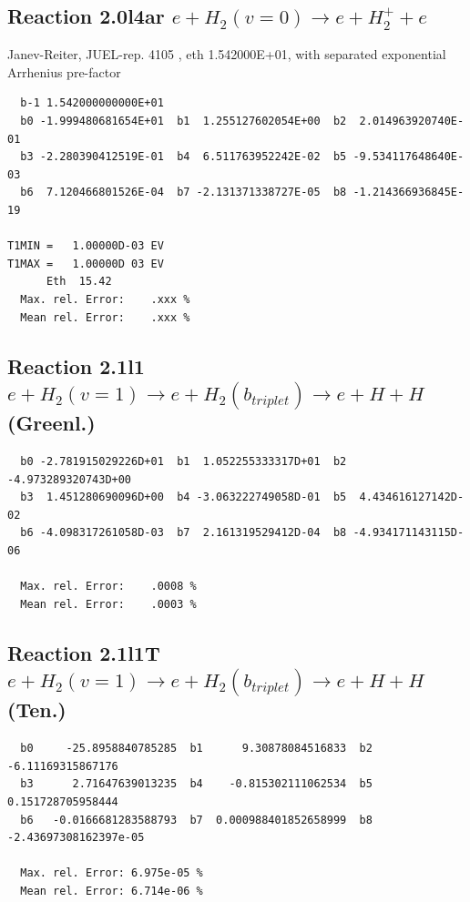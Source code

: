 \documentclass[12pt,dvipdfmx]{article}
\begin{document}
\subsection{
Reaction 2.0l4ar
 $ e + H_2(v=0) \rightarrow e + H_2^+ + e$
}
Janev-Reiter, JUEL-rep. 4105 \cite{kn:JRS}, eth 1.542000E+01,
with separated exponential Arrhenius pre-factor

\begin{small}\begin{verbatim}
  b-1 1.542000000000E+01
  b0 -1.999480681654E+01  b1  1.255127602054E+00  b2  2.014963920740E-01
  b3 -2.280390412519E-01  b4  6.511763952242E-02  b5 -9.534117648640E-03
  b6  7.120466801526E-04  b7 -2.131371338727E-05  b8 -1.214366936845E-19

T1MIN =   1.00000D-03 EV
T1MAX =   1.00000D 03 EV
      Eth  15.42
  Max. rel. Error:    .xxx %
  Mean rel. Error:    .xxx %
\end{verbatim}\end{small}

\newpage
\subsection{
Reaction 2.1l1
$ e + H_2(v=1) \rightarrow e + H_2(b_{triplet})\rightarrow e + H + H $ (Greenl.)
}


\begin{small}\begin{verbatim}
  b0 -2.781915029226D+01  b1  1.052255333317D+01  b2 -4.973289320743D+00
  b3  1.451280690096D+00  b4 -3.063222749058D-01  b5  4.434616127142D-02
  b6 -4.098317261058D-03  b7  2.161319529412D-04  b8 -4.934171143115D-06

  Max. rel. Error:    .0008 %
  Mean rel. Error:    .0003 %

\end{verbatim}\end{small}


\subsection{
Reaction 2.1l1T
$ e +  H_2(v=1) \rightarrow e + H_2(b_{triplet})\rightarrow e + H + H $ (Ten.)
}

\begin{small}\begin{verbatim}
  b0     -25.8958840785285  b1      9.30878084516833  b2     -6.11169315867176
  b3      2.71647639013235  b4    -0.815302111062534  b5     0.151728705958444
  b6   -0.0166681283588793  b7  0.000988401852658999  b8 -2.43697308162397e-05

  Max. rel. Error: 6.975e-05 %
  Mean rel. Error: 6.714e-06 %
\end{verbatim}\end{small}
\end{document}
